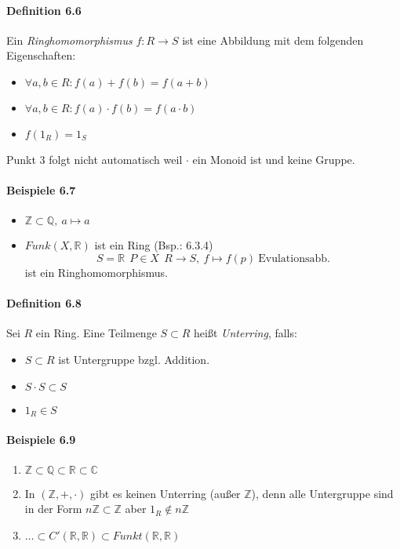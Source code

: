 \documentclass{scrartcl}
\begin{document}
\paragraph{Definition 6.6}
Ein \textit{Ringhomomorphismus} $f: R \to S$ ist eine Abbildung mit dem
folgenden Eigenschaften:
\begin{itemize}
\item $\forall a,b \in R: f(a) + f(b) = f(a + b)$
\item $\forall a,b \in R: f(a) \cdot f(b) = f(a \cdot b)$
\item $f(1_R) = 1_S$
\end{itemize}
Punkt 3 folgt nicht automatisch weil $\cdot$ ein Monoid ist und keine Gruppe.

\paragraph{Beispiele 6.7}
\begin{itemize}
\item $\mathbb{Z} \subset \mathbb{Q},~a \mapsto a$
\item $Funk(X, \mathbb{R})$ ist ein Ring (Bsp.: 6.3.4)
  \[
    S = \mathbb{R}~~P \in X~~R \to S,~f \mapsto f(p)~\text{Evulationsabb.}
  \]
  ist ein Ringhomomorphismus.
\end{itemize}

\paragraph{Definition 6.8}
Sei $R$ ein Ring. Eine Teilmenge $S \subset R$ heißt \textit{Unterring}, falls:
\begin{itemize}
\item $S \subset R$ ist Untergruppe bzgl. Addition.
\item $S \cdot S \subset S$
\item $1_R \in S$
\end{itemize}

\paragraph{Beispiele 6.9}
\begin{enumerate}
\item $\mathbb{Z} \subset \mathbb{Q} \subset \mathbb{R} \subset \mathbb{C}$
\item In $(\mathbb{Z}, +, \cdot)$ gibt es keinen Unterring (außer $\mathbb{Z}$),
  denn alle  Untergruppe sind in der Form $n \mathbb{Z} \subset \mathbb{Z}$ aber
  $1_R \notin n \mathbb{Z}$
\item $\dots \subset C'(\mathbb{R}, \mathbb{R}) \subset Funkt(\mathbb{R},
  \mathbb{R})$
\end{enumerate}
\end{document}
